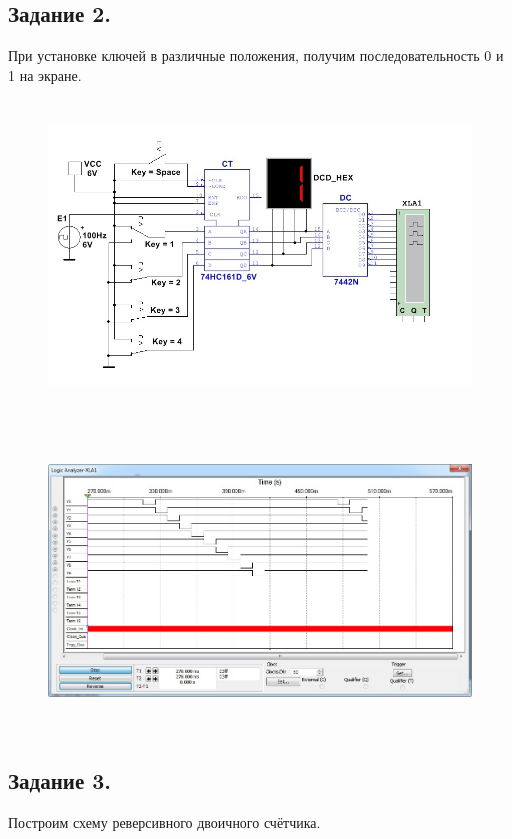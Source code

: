 \documentclass[spec, och, labwork]{shiza}
\begin{document}
\subsection*{Задание 2.}

При установке ключей в различные положения, получим последовательность 0
и 1 на экране.

\begin{figure}[H]
    \centering
    \includegraphics[width=5.29307in,height=3.24242in]{image6.jpeg}
\end{figure}

\begin{figure}[H]
    \centering
    \includegraphics[width=5.74147in,height=3.15152in]{image7.jpeg}
\end{figure}


\subsection*{Задание 3.}

Построим схему реверсивного двоичного счётчика.
\end{document}
